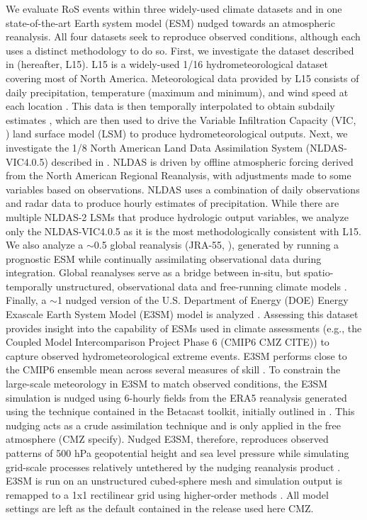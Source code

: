 \documentclass[nhess, manuscript]{copernicus}
\begin{document}
We evaluate RoS events within three widely-used climate datasets and in one state-of-the-art Earth system model (ESM) nudged towards an atmospheric reanalysis.
All four datasets seek to reproduce observed conditions, although each uses a distinct methodology to do so.
First, we investigate the dataset described in \citet{livneh2015spatially} (hereafter, L15).
L15 is a widely-used 1/16\degree{} hydrometeorological dataset covering most of North America.
Meteorological data provided by L15 consists of daily precipitation, temperature (maximum and minimum), and wind speed at each location \citep{henn2018an}.
This data is then temporally interpolated to obtain subdaily estimates \citep{bohn2013global}, which are then used to drive the Variable Infiltration Capacity (VIC, \citet{liang1994simple}) land surface model (LSM) to produce hydrometeorological outputs.
Next, we investigate the 1/8\degree{} North American Land Data Assimilation System (NLDAS-VIC4.0.5)  described in \citet{xia2012continental1}.
NLDAS is driven by offline atmospheric forcing derived from the North American Regional Reanalysis, with adjustments made to some variables based on observations.
NLDAS uses a combination of daily observations and radar data to produce hourly estimates of precipitation.
While there are multiple NLDAS-2 LSMs that produce hydrologic output variables, we analyze only the NLDAS-VIC4.0.5 as it is the most methodologically consistent with L15.
We also analyze a $\sim$0.5\degree{} global reanalysis (JRA-55, \citet{kobayashi2015jra55}), generated by running a prognostic ESM while continually assimilating observational data during integration.
Global reanalyses serve as a bridge between in-situ, but spatio-temporally unstructured, observational data and free-running climate models \citep{parker2016reanalyses}.
Finally, a $\sim$1\degree{} nudged version of the U.S. Department of Energy (DOE) Energy Exascale Earth System Model (E3SM) model is analyzed \citep{zhang2022further}. Assessing this dataset provides insight into the capability of ESMs used in climate assessments (e.g., the Coupled Model Intercomparison Project Phase 6 (CMIP6 CMZ CITE)) to capture observed hydrometeorological extreme events.
E3SM performs close to the CMIP6 ensemble mean across several measures of skill \citep{Fasullo2020}.
To constrain the large-scale meteorology in E3SM to match observed conditions, the E3SM simulation is nudged using 6-hourly fields from the ERA5 reanalysis \citep{hersbach2020era5} generated using the technique contained in the Betacast toolkit, initially outlined in \citet{zarzycki2015experimental}.
This nudging acts as a crude assimilation technique and is only applied in the free atmosphere (CMZ specify).
Nudged E3SM, therefore, reproduces observed patterns of 500 hPa geopotential height and sea level pressure while simulating grid-scale processes relatively untethered by the nudging reanalysis product \citep{sun2019impact}.
E3SM is run on an unstructured cubed-sphere mesh and simulation output is remapped to a 1\degree{}x1\degree{} rectilinear grid using higher-order methods \citep{hill2004architecture}. All model settings are left as the default contained in the release used here CMZ.
\end{document}
